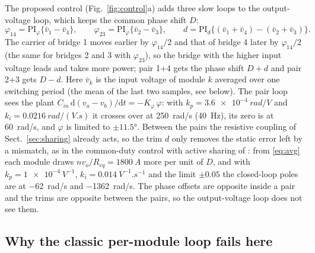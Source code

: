 \documentclass[10pt,a4paper]{scrartcl}
\newcommand{\Req}{R_{eq}}
\newcommand{\vo}{v_o}
\begin{document}
\begin{onehalfspace}
The proposed control (Fig.~\ref{fig:control}a) adds three slow loops to the output-voltage loop, which keeps the common phase shift $D$:
\begin{equation}
\varphi_{14} = \mathrm{PI}_\varphi\{\bar v_1 - \bar v_4\}, \qquad \varphi_{23} = \mathrm{PI}_\varphi\{\bar v_2 - \bar v_3\}, \qquad d = \mathrm{PI}_d\{(\bar v_1 + \bar v_4) - (\bar v_2 + \bar v_3)\}.
\end{equation}
The carrier of bridge 1 moves earlier by $\varphi_{14}/2$ and that of bridge 4 later by $\varphi_{14}/2$ (the same for bridges 2 and 3 with $\varphi_{23}$), so the bridge with the higher input voltage leads and takes more power; pair 1+4 gets the phase shift $D + d$ and pair 2+3 gets $D - d$. Here $\bar v_k$ is the input voltage of module $k$ averaged over one switching period (the mean of the last two samples, see below). The pair loop sees the plant $C_{in}\,\mathrm{d}(v_a - v_b)/\mathrm{d}t = -K_\varphi\,\varphi$: with $k_p = \SI{3.6e-4}{rad/V}$ and $k_i = \SI{0.0216}{rad/(V.s)}$ it crosses over at \SI{250}{rad/s} (\SI{40}{Hz}), its zero is at \SI{60}{rad/s}, and $\varphi$ is limited to $\pm\ang{11.5}$. Between the pairs the resistive coupling of Sect.~\ref{sec:sharing} already acts, so the trim $d$ only removes the static error left by a mismatch, as in the common-duty control with active sharing of \cite{giri2006}: from \eqref{eq:avg} each module draws $n\vo/\Req = \SI{1800}{A}$ more per unit of $D$, and with $k_p = \SI{1e-4}{V^{-1}}$, $k_i = \SI{0.014}{V^{-1}.s^{-1}}$ and the limit $\pm 0.05$ the closed-loop poles are at \SI{-62}{rad/s} and \SI{-1362}{rad/s}. The phase offsets are opposite inside a pair and the trims are opposite between the pairs, so the output-voltage loop does not see them.

\subsection{Why the classic per-module loop fails here}


\end{onehalfspace}
\end{document}
